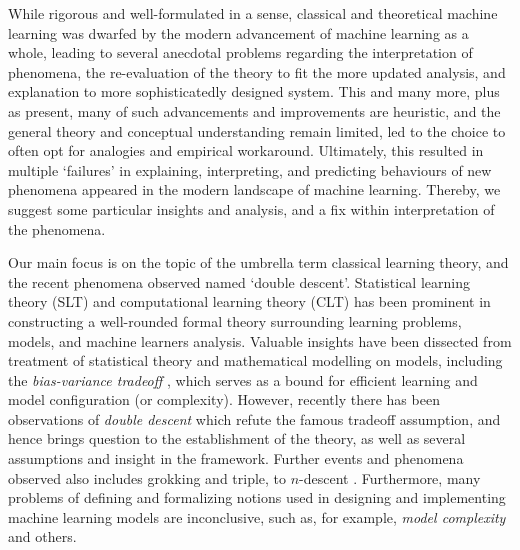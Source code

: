 \documentclass[10pt]{article}
\begin{document}
While rigorous and well-formulated in a sense, classical and theoretical machine learning was dwarfed by the modern advancement of machine learning as a whole, leading to several anecdotal problems regarding the interpretation of phenomena, the re-evaluation of the theory to fit the more updated analysis, and explanation to more sophisticatedly designed system. This and many more, plus as present, many of such advancements and improvements are heuristic, and the general theory and conceptual understanding remain limited, led to the choice to often opt for analogies and empirical workaround. Ultimately, this resulted in multiple `failures' in explaining, interpreting, and predicting behaviours of new phenomena appeared in the modern landscape of machine learning. Thereby, we suggest some particular insights and analysis, and a fix within interpretation of the phenomena. 

Our main focus is on the topic of the umbrella term classical learning theory, and the recent phenomena observed named `double descent'. Statistical learning theory (SLT) and computational learning theory (CLT) \cite{Vapnik1999-VAPTNO,10.5555/2371238,10.5555/2621980,STL_Hajek_Maxim_2021,bousquet2020theoryuniversallearning} has been prominent in constructing a well-rounded formal theory surrounding learning problems, models, and machine learners analysis. Valuable insights have been dissected from treatment of statistical theory and mathematical modelling on models, including the \textit{bias-variance tradeoff} \cite{6797087,Domingos2000AUB}, which serves as a bound for efficient learning and model configuration (or complexity). However, recently there has been observations of \textit{double descent} \cite{belkin_reconciling_2019,schaeffer_double_2023,nakkiran_deep_2019,lafon_understanding_2024} which refute the famous tradeoff assumption, and hence brings question to the establishment of the theory, as well as several assumptions and insight in the framework. Further events and phenomena observed also includes grokking and triple, to $n$-descent \cite{davies_unifying_2023,d_ascoli_triple_2020}. Furthermore, many problems of defining and formalizing notions used in designing and implementing machine learning models are inconclusive, such as, for example, \textit{model complexity} and others. 
\end{document}
